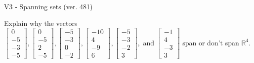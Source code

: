\begin{exercise}
  \begin{exerciseTitle}V3 - Spanning sets (ver. 481)\end{exerciseTitle}
  \begin{exerciseStatement}
    Explain why the vectors \(\left[\begin{array}{r}
0 \\
-5 \\
-3 \\
-5
\end{array}\right] , \left[\begin{array}{r}
0 \\
-5 \\
2 \\
-5
\end{array}\right] , \left[\begin{array}{r}
-5 \\
-3 \\
0 \\
-2
\end{array}\right] , \left[\begin{array}{r}
-10 \\
4 \\
-9 \\
6
\end{array}\right] , \left[\begin{array}{r}
-5 \\
-3 \\
-2 \\
3
\end{array}\right] , \text{ and } \left[\begin{array}{r}
-1 \\
4 \\
-3 \\
3
\end{array}\right]\) span or don't span \(\mathbb{R}^4\). 
	



\end{exerciseStatement}
\end{exercise}
